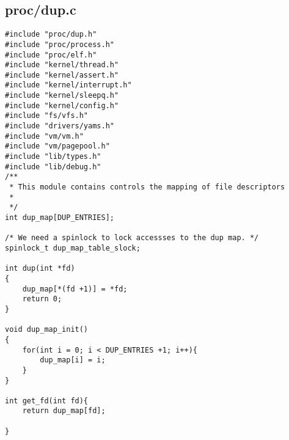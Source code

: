 \documentclass[a4paper,12pt,danish]{report}
\begin{document}
\subsection{proc/dup.c}
\begin{verbatim}
#include "proc/dup.h"
#include "proc/process.h"
#include "proc/elf.h"
#include "kernel/thread.h"
#include "kernel/assert.h"
#include "kernel/interrupt.h"
#include "kernel/sleepq.h"
#include "kernel/config.h"
#include "fs/vfs.h"
#include "drivers/yams.h"
#include "vm/vm.h"
#include "vm/pagepool.h"
#include "lib/types.h"
#include "lib/debug.h"
/**
 * This module contains controls the mapping of file descriptors
 *
 */
int dup_map[DUP_ENTRIES];

/* We need a spinlock to lock accessses to the dup map. */
spinlock_t dup_map_table_slock;

int dup(int *fd)
{
    dup_map[*(fd +1)] = *fd;
    return 0;
}

void dup_map_init()
{
    for(int i = 0; i < DUP_ENTRIES +1; i++){
        dup_map[i] = i;
    }
}

int get_fd(int fd){
    return dup_map[fd];

}


\end{verbatim}
\end{document}

